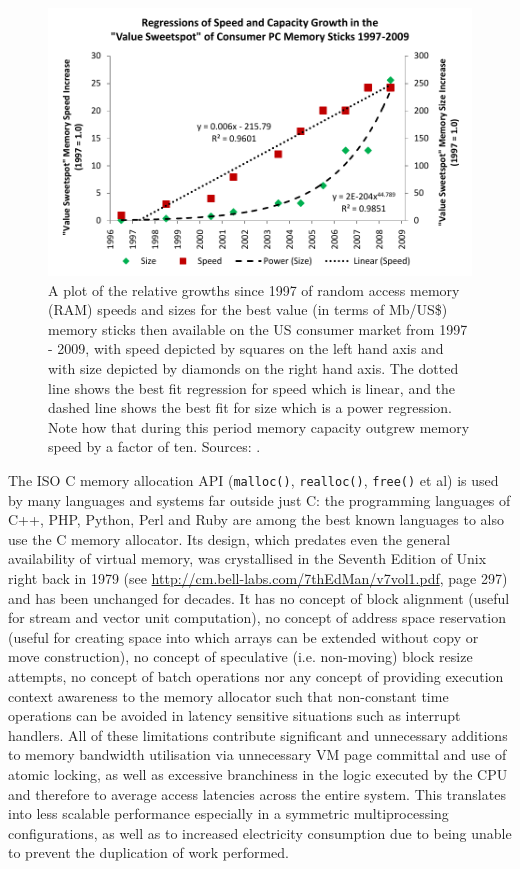 \documentclass[wd]{isov2}
\begin{document}
{\begin{foreword}
\begin{figure}[h]
  \centering
    \includegraphics{MemorySizeVsSpeed}
  \caption{A plot of the relative growths since 1997 of random access memory (RAM) speeds and sizes for the best value (in terms of Mb/US\$) memory sticks then available on the US consumer market from 1997 - 2009, with speed depicted by squares on the left hand axis and with size depicted by diamonds on the right hand axis. The dotted line shows the best fit regression for speed which is linear, and the dashed line shows the best fit for size which is a power regression. Note how that during this period memory capacity outgrew memory speed by a factor of ten. Sources:  .}
  \label{FigMemorySizeVsSpeed}
\end{figure}

The ISO C memory allocation API (\texttt{malloc()}, \texttt{realloc()}, \texttt{free()} et al) is used by many languages and systems far outside just C: the programming languages of C++, PHP, Python, Perl and Ruby are among the best known languages to also use the C memory allocator. Its design, which predates even the general availability of virtual memory, was crystallised in the Seventh Edition of Unix right back in 1979 (see \url{http://cm.bell-labs.com/7thEdMan/v7vol1.pdf}, page 297) and has been unchanged for decades. It has no concept of block alignment (useful for stream and vector unit computation), no concept of address space reservation (useful for creating space into which arrays can be extended without copy or move construction), no concept of speculative (i.e. non-moving) block resize attempts, no concept of batch operations nor any concept of providing execution context awareness to the memory allocator such that non-constant time operations can be avoided in latency sensitive situations such as interrupt handlers. All of these limitations contribute significant and unnecessary additions to memory bandwidth utilisation via unnecessary VM page committal and use of atomic locking, as well as excessive branchiness in the logic executed by the CPU and therefore to average access latencies across the entire system. This translates into less scalable performance especially in a symmetric multiprocessing configurations, as well as to increased electricity consumption due to being unable to prevent the duplication of work performed.


\end{foreword}}
\end{document}
